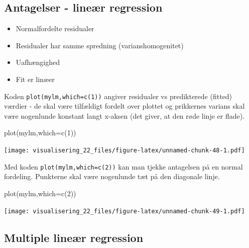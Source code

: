 \documentclass[
]{book}
\newenvironment{Shaded}{\begin{snugshade}}{\end{snugshade}}
\newcommand{\AttributeTok}[1]{\textcolor[rgb]{0.77,0.63,0.00}{#1}}
\newcommand{\DecValTok}[1]{\textcolor[rgb]{0.00,0.00,0.81}{#1}}
\newcommand{\FunctionTok}[1]{\textcolor[rgb]{0.00,0.00,0.00}{#1}}
\newcommand{\NormalTok}[1]{#1}
\providecommand{\tightlist}{%
  \setlength{\itemsep}{0pt}\setlength{\parskip}{0pt}}
\begin{document}
\hypertarget{antagelser---lineuxe6r-regression}{%
\subsection{Antagelser - lineær regression}\label{antagelser---lineuxe6r-regression}}

\begin{itemize}
\tightlist
\item
  Normalfordelte residualer
\item
  Residualer har samme spredning (varianshomogenitet)
\item
  Uafhængighed
\item
  Fit er linæer
\end{itemize}

Koden \texttt{plot(mylm,which=c(1))} angiver residualer vs predikterede (fitted) værdier - de skal være tilfældigt fordelt over plottet og prikkernes varians skal være nogenlunde konstant langt x-aksen (det giver, at den røde linje er flade).

\begin{Shaded}
\begin{Highlighting}[]
\FunctionTok{plot}\NormalTok{(mylm,}\AttributeTok{which=}\FunctionTok{c}\NormalTok{(}\DecValTok{1}\NormalTok{))}
\end{Highlighting}
\end{Shaded}

\texttt{[image: visualisering\_22\_files/figure-latex/unnamed-chunk-48-1.pdf]}

Med koden \texttt{plot(mylm,which=c(2))} kan man tjekke antagelsen på en normal fordeling. Punkterne skal være nogenlunde tæt på den diagonale linje.

\begin{Shaded}
\begin{Highlighting}[]
\FunctionTok{plot}\NormalTok{(mylm,}\AttributeTok{which=}\FunctionTok{c}\NormalTok{(}\DecValTok{2}\NormalTok{))}
\end{Highlighting}
\end{Shaded}

\texttt{[image: visualisering\_22\_files/figure-latex/unnamed-chunk-49-1.pdf]}

\hypertarget{multiple-lineuxe6r-regression}{%
\subsection{Multiple lineær regression}\label{multiple-lineuxe6r-regression}}
\end{document}
